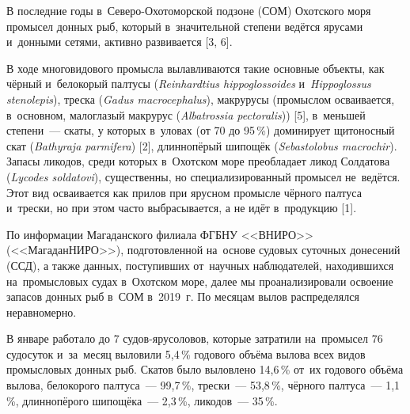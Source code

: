 



\makeProcTitleIVNewLine
{}



В последние годы в~Северо-Охотоморской подзоне (СОМ) Охотского моря промысел донных рыб, который в~значительной степени ведётся ярусами и~донными сетями, активно развивается [3, 6].

В ходе многовидового промысла вылавливаются такие основные объекты, как чёрный и~белокорый палтусы (\textit{Reinhardtius hippoglossoides} и~\textit{Hip\-po\-glos\-sus stenolepis}), треска (\textit{Gadus macrocephalus}), макрурусы (промыслом осваивается, в~основном, малоглазый макрурус (\textit{Albatrossia pectoralis})) [5], в~меньшей степени~--- скаты, у которых в~уловах (от 70 до 95\,\%) доминирует щитоносный скат (\textit{Bathyraja parmifera}) [2], длиннопёрый шипощёк (\textit{Sebastolobus macrochir}). Запасы ликодов, среди которых в~Охотском море преобладает ликод Солдатова (\textit{Lycodes soldatovi}), существенны, но специализированный промысел не~ведётся. Этот вид осваивается как прилов при ярусном промысле чёрного палтуса и~трески, но при этом часто выбрасывается, а не идёт в~продукцию [1].

По информации Магаданского филиала ФГБНУ <<ВНИРО>> (<<МагаданНИРО>>), подготовленной на~основе судовых суточных донесений (ССД), а также данных, поступивших от~научных наблюдателей, находившихся на~промысловых судах в~Охотском море, далее мы проанализировали освоение запасов донных рыб в~СОМ в~2019~г. По месяцам вылов распределялся неравномерно.

В январе работало до 7 судов-ярусоловов, которые затратили на~промысел 76 судосуток и~за~месяц выловили 5,4\,\% годового объёма вылова всех видов промысловых донных рыб. Скатов было выловлено 14,6\,\% от~их годового объёма вылова, белокорого палтуса~--- 99,7\,\%, трески~--- 53,8\,\%, чёрного палтуса~--- 1,1\,\%, длиннопёрого шипощёка~--- 2,3\,\%, ликодов~--- 35\,\%.

